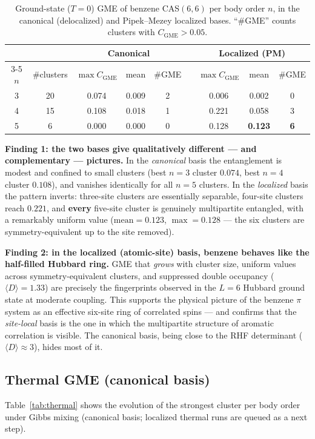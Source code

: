 \documentclass[11pt]{article}
\newcommand{\CGME}{\ensuremath{C_{\mathrm{GME}}}}
\begin{document}
\begin{table}[h!]
\centering
\caption{Ground-state ($T=0$) GME of benzene CAS$(6,6)$ per body order $n$,
in the canonical (delocalized) and Pipek--Mezey localized bases.
``\#GME'' counts clusters with $\CGME>0.05$.}\label{tab:t0}
\begin{tabular}{@{}c c ccc c ccc@{}}
\toprule
 & & \multicolumn{3}{c}{\textbf{Canonical}} & \phantom{x} &
     \multicolumn{3}{c}{\textbf{Localized (PM)}} \\
\cmidrule{3-5}\cmidrule{7-9}
$n$ & \#clusters & $\max\CGME$ & mean & \#GME & &
      $\max\CGME$ & mean & \#GME \\
\midrule
3 & 20 & 0.074 & 0.009 & 2 & & 0.006 & 0.002 & 0 \\
4 & 15 & 0.108 & 0.018 & 1 & & 0.221 & 0.058 & 3 \\
5 &  6 & 0.000 & 0.000 & 0 & & 0.128 & \textbf{0.123} & \textbf{6} \\
\bottomrule
\end{tabular}
\end{table}

\noindent\textbf{Finding 1: the two bases give qualitatively different --- and
complementary --- pictures.} In the \emph{canonical} basis the entanglement is
modest and confined to small clusters (best $n{=}3$ cluster $0.074$, best
$n{=}4$ cluster $0.108$), and vanishes identically for all $n{=}5$ clusters.
In the \emph{localized} basis the pattern inverts: three-site clusters are
essentially separable, four-site clusters reach $0.221$, and \textbf{every}
five-site cluster is genuinely multipartite entangled, with a remarkably
uniform value ($\mathrm{mean}=0.123$, $\max=0.128$ --- the six clusters are
symmetry-equivalent up to the site removed).

\textbf{Finding 2: in the localized (atomic-site) basis, benzene behaves like
the half-filled Hubbard ring.} GME that \emph{grows} with cluster size, uniform
values across symmetry-equivalent clusters, and suppressed double occupancy
($\langle D\rangle=1.33$) are precisely the fingerprints observed in the $L=6$
Hubbard ground state at moderate coupling. This supports the physical picture
of the benzene $\pi$ system as an effective six-site ring of correlated
spins --- and confirms that the \emph{site-local} basis is the one in which the
multipartite structure of aromatic correlation is visible. The canonical basis,
being close to the RHF determinant ($\langle D\rangle\approx3$), hides most of
it.

\subsection{Thermal GME (canonical basis)}
Table~\ref{tab:thermal} shows the evolution of the strongest cluster per body
order under Gibbs mixing (canonical basis; localized thermal runs are queued as
a next step).
\end{document}
